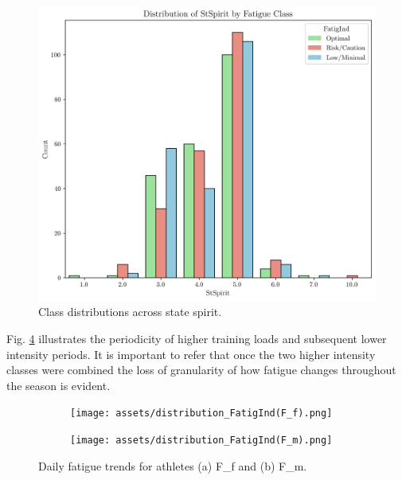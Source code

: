 \documentclass[conference]{IEEEtran}
\begin{document}
\begin{figure}[H]
    \centering
    \includegraphics[width=1\linewidth]{assets/distribution_StSpirit.png}
    \caption{Class distributions across state spirit.}
    \label{distStSpirit}
\end{figure} %


Fig. \ref{fadig_ts} illustrates the periodicity of higher training loads and subsequent lower intensity periods. It is important to refer that once the two higher intensity classes were combined the loss of granularity of how fatigue changes throughout the season is evident.  

\begin{figure}[H]
    \centering
    \begin{subfigure}[1]{\linewidth}
        \centering
        \texttt{[image: assets/distribution\_FatigInd(F\_f).png]}
        \caption{ }
        \label{fat_ff}
    \end{subfigure}
    
    \vspace{0.27cm}

    \begin{subfigure}[1]{\linewidth}
        \centering
        \texttt{[image: assets/distribution\_FatigInd(F\_m).png]}
        \caption{ }
        \label{fat_fm}
    \end{subfigure}
    
    \caption{Daily fatigue trends for athletes (a) F\_f and (b) F\_m.}
    \label{fadig_ts}
\end{figure} %
\end{document}
